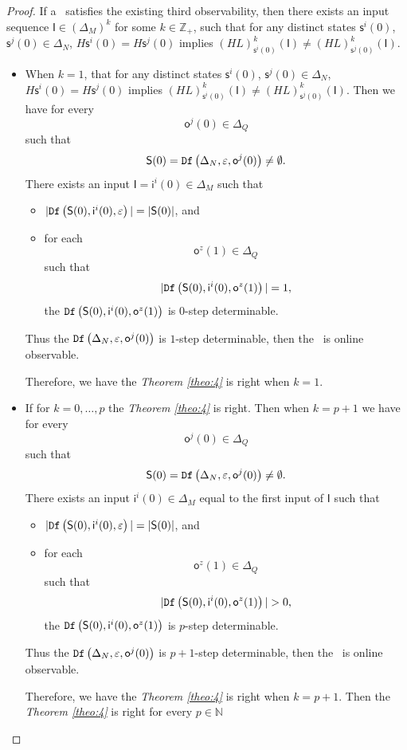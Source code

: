 \begin{proof}
If a \BCN\ satisfies the existing third observability, then there exists an input sequence $\mathsf{I}\in(\Delta_M)^k$ for some $k\in \mathbb{Z}_+$, such that for any distinct states $\mathsf{s}^{i}(0)$, $\mathsf{s}^{j}(0) \in \Delta_N$, $H\mathsf{s}^{i}(0)=H\mathsf{s}^{j}(0)$ implies $(HL)^k_{\mathsf{s}^{i}(0)}(\mathsf{I})\neq (HL)^k_{\mathsf{s}^{j}(0)}(\mathsf{I})$.
\begin{itemize}
\item When $k=1$, that for any distinct states $\mathsf{s}^{i}(0)$, $\mathsf{s}^{j}(0) \in \Delta_N$, $H\mathsf{s}^{i}(0)=H\mathsf{s}^{j}(0)$ implies $(HL)^k_{\mathsf{s}^{i}(0)}(\mathsf{I})\neq (HL)^k_{\mathsf{s}^{j}(0)}(\mathsf{I})$. Then we have for every \[\mathsf{o}^{j}(0)\in \Delta_Q\] such that \[\mathsf{S}(0)={\tt Df}\left(\Delta_N,\varepsilon, \mathsf{o}^{j}(0)\right)\ne\emptyset.\] 
 There exists an input $\mathsf{I}=\mathsf{i}^{i}(0) \in \Delta_M$ such that
 \begin{itemize}
 \item  $|{\tt Df}\left(\mathsf{S}(0),\mathsf{i}^{i}(0),\varepsilon\right)|=|\mathsf{S}(0)|$, and 
 \item  for each \[\mathsf{o}^{z}(1)\in \Delta_Q\] such that \[|{\tt Df}\left(\mathsf{S}(0),\mathsf{i}^{i}(0),\mathsf{o}^{z}(1)\right)|=1,\] the ${\tt Df}\left(\mathsf{S}(0),\mathsf{i}^{i}(0),\mathsf{o}^{z}(1)\right)$ is $0$-step determinable.
 \end{itemize}
Thus the ${\tt Df}\left(\Delta_N,\varepsilon,\mathsf{o}^{j}(0)\right)$ is $1$-step determinable, then the \BCN\ is online observable.

Therefore, we have the {\em Theorem \ref{theo:4}} is right when $k=1$.
\item If for $k=0,\ldots, p$ the {\em Theorem \ref{theo:4}} is right. Then when $k=p+1$ we have for every \[\mathsf{o}^{j}(0)\in \Delta_Q\] such that \[\mathsf{S}(0)={\tt Df}\left(\Delta_N,\varepsilon, \mathsf{o}^{j}(0)\right)\ne\emptyset.\] 
 There exists an input $\mathsf{i}^{i}(0) \in \Delta_M$ equal to the first input of $\mathsf{I}$ such that
 \begin{itemize}
 \item  $|{\tt Df}\left(\mathsf{S}(0),\mathsf{i}^{i}(0),\varepsilon\right)|=|\mathsf{S}(0)|$, and 
 \item  for each \[\mathsf{o}^{z}(1)\in \Delta_Q\] such that \[|\Ded\left(\mathsf{S}(0),\mathsf{i}^{i}(0),\mathsf{o}^{z}(1)\right)|>0,\] the ${\tt Df}\left(\mathsf{S}(0),\mathsf{i}^{i}(0),\mathsf{o}^{z}(1)\right)$ is $p$-step determinable.
 \end{itemize}
Thus the ${\tt Df}\left(\Delta_N,\varepsilon,\mathsf{o}^{j}(0)\right)$ is $p+1$-step determinable, then the \BCN\ is online observable.

Therefore, we have the {\em Theorem \ref{theo:4}} is right when $k=p+1$. Then the {\em Theorem \ref{theo:4}} is right for every $p \in \mathbb{N}$
 \end{itemize}
\end{proof}

